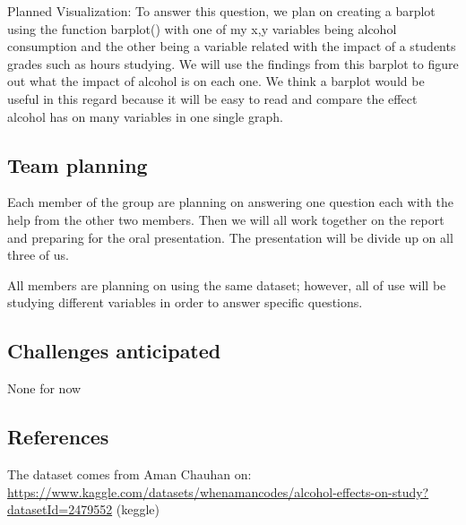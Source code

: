 \documentclass[
]{article}
\begin{document}
Planned Visualization: To answer this question, we plan on creating a
barplot using the function barplot() with one of my x,y variables being
alcohol consumption and the other being a variable related with the
impact of a students grades such as hours studying. We will use the
findings from this barplot to figure out what the impact of alcohol is
on each one. We think a barplot would be useful in this regard because
it will be easy to read and compare the effect alcohol has on many
variables in one single graph.

\hypertarget{team-planning}{%
\subsection{Team planning}\label{team-planning}}

Each member of the group are planning on answering one question each
with the help from the other two members. Then we will all work together
on the report and preparing for the oral presentation. The presentation
will be divide up on all three of us.

All members are planning on using the same dataset; however, all of use
will be studying different variables in order to answer specific
questions.

\hypertarget{challenges-anticipated}{%
\subsection{Challenges anticipated}\label{challenges-anticipated}}

None for now

\hypertarget{references}{%
\subsection{References}\label{references}}

The dataset comes from Aman Chauhan on:
\url{https://www.kaggle.com/datasets/whenamancodes/alcohol-effects-on-study?datasetId=2479552}
(keggle)
\end{document}
